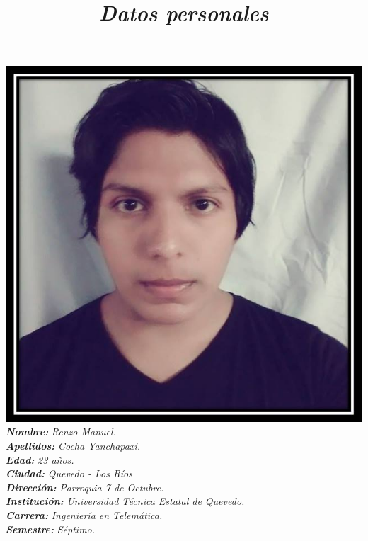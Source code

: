 \documentclass[12pt,a4paper]{article}
\title{\textbf{\textsl{Datos personales}}}
\date{}
\begin{document}
\maketitle                                                     
\includegraphics[scale=0.2]{2.jpg} \newline\\

\textbf{\textsl{Nombre:}} \textsl{Renzo Manuel.}\newline\\

\textbf{\textsl{Apellidos:}} \textsl{Cocha Yanchapaxi.}\newline\\

\textbf{\textsl{Edad:}} \textsl{23 años.}\newline\\

\textbf{\textsl{Ciudad:}} \textsl{Quevedo - Los Ríos}\newline\\

\textbf{\textsl{Dirección:}} \textsl{Parroquia 7 de Octubre.}\newline\\

\textbf{\textsl{Institución:}} \textsl{Universidad Técnica Estatal de Quevedo.}\newline\\

\textbf{\textsl{Carrera:}} \textsl{Ingeniería en Telemática.}\newline\\

\textbf{\textsl{Semestre:}} \textsl{Séptimo.}\newline\\
\end{document}
